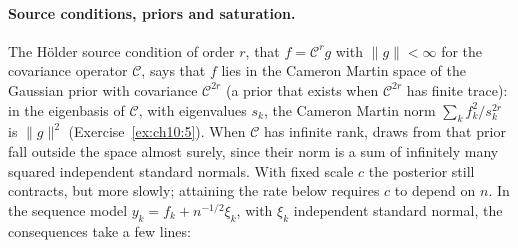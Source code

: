 \paragraph{Source conditions, priors and saturation.}  The H\"older source condition of order $r$, that $f = \mathcal{C}^{r} g$ with $\|g\| < \infty$ for the covariance operator $\mathcal{C}$, says that $f$ lies in the Cameron Martin space of the Gaussian prior with covariance $\mathcal{C}^{2r}$ (a prior that exists when $\mathcal{C}^{2r}$ has finite trace): in the eigenbasis of $\mathcal{C}$, with eigenvalues $s_k$, the Cameron Martin norm $\sum_k f_k^2/s_k^{2r}$ is $\|g\|^2$ (Exercise~\ref{ex:ch10:5}). When $\mathcal{C}$ has infinite rank, draws from that prior fall outside the space almost surely, since their norm is a sum of infinitely many squared independent standard normals. With fixed scale $c$ the posterior still contracts, but more slowly; attaining the rate below requires $c$ to depend on $n$. In the sequence model $y_k = f_k + n^{-1/2}\xi_k$, with $\xi_k$ independent standard normal, the consequences take a few lines:
